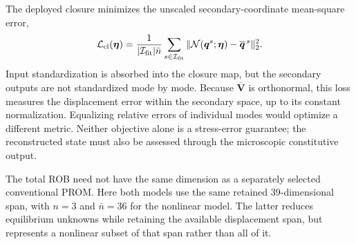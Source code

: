 The deployed closure minimizes the unscaled secondary-coordinate mean-square error,
\begin{equation}
 \mathcal L_{\rm cl}(\bm\eta)=
 \frac{1}{|\mathcal I_{\rm fit}|\bar n}
 \sum_{s\in\mathcal I_{\rm fit}}
 \|\mathcal N(\bm q^s;\bm\eta)-\overline{\bm q}^{\,s}\|_2^2.
 \label{eq:closure_loss}
\end{equation}
Input standardization is absorbed into the closure map, but the secondary outputs are not standardized mode by mode. Because $\overline{\bm V}$ is orthonormal, this loss measures the displacement error within the secondary space, up to its constant normalization. Equalizing relative errors of individual modes would optimize a different metric. Neither objective alone is a stress-error guarantee; the reconstructed state must also be assessed through the microscopic constitutive output.

The total ROB need not have the same dimension as a separately selected conventional PROM. Here both models use the same retained 39-dimensional span, with $n=3$ and $\bar n=36$ for the nonlinear model. The latter reduces equilibrium unknowns while retaining the available displacement span, but represents a nonlinear subset of that span rather than all of it.

